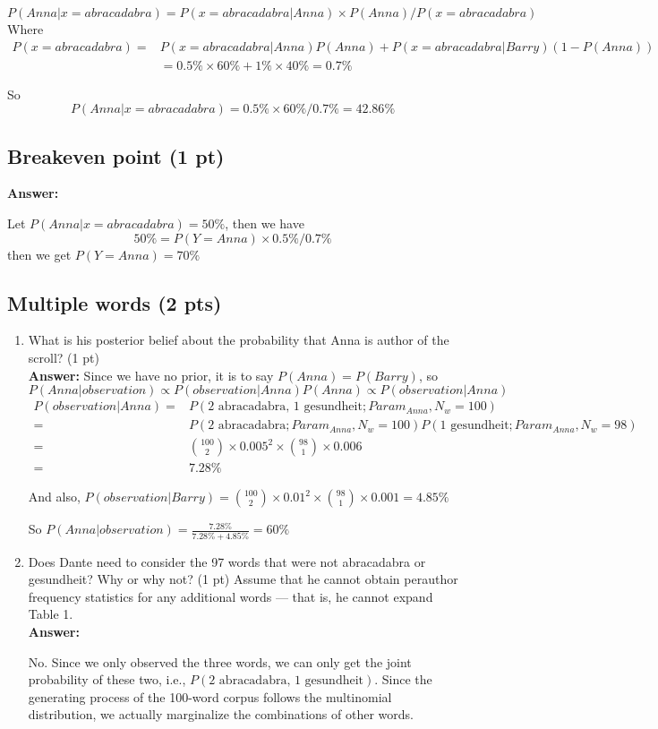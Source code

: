 \documentclass[twoside,11pt]{article}\usepackage{amsmath,amsfonts,amsthm,fullpage}
\begin{document}
\[
	P(Anna | x = abracadabra) = P(x = abracadabra | Anna) \times P(Anna) / P(x = abracadabra)
\]
Where 
\begin{align*}
		P(x = abracadabra) =&  
			 P(x = abracadabra | Anna)P(Anna) + P(x = abracadabra | Barry)(1 - P(Anna)) \\
			 &= 
			 0.5\% \times 60\% + 1\% \times 40\% = 0.7 \%
\end{align*}

So 
\[
	P(Anna | x = abracadabra) = 0.5\% \times 60\% / 0.7\% = 42.86\%	
\]

\subsection{Breakeven point (1 pt)}

\textbf{Answer:}

	Let $P(Anna | x = abracadabra) = 50\%$, then we have
\[
	50 \% = P(Y = Anna) \times 0.5\% / 0.7\%
\]
	then we get $P(Y = Anna) = 70\%$

\subsection{Multiple words (2 pts)}

	\begin{enumerate}
		\item What is his posterior belief about the probability that Anna is author of
the scroll? (1 pt) \\
		\textbf{Answer:}
Since we have no prior, it is to say $P(Anna) = P(Barry)$, so
\[
	P(Anna | observation) \propto P(observation | Anna) P(Anna) \propto P(observation | Anna)
\]
\begin{align*}
		P(observation | Anna) =&  P(\text{2 abracadabra, 1 gesundheit}; Param_{Anna}, N_w = 100) \\
		=& P(\text{2 abracadabra}; Param_{Anna}, N_w = 100) P(\text{1 gesundheit}; Param_{Anna}, N_w = 98) \\
		=& \binom{100}{2} \times 0.005 ^ 2 \times \binom{98}{1} \times 0.006 \\
		=& 7.28\%
\end{align*}

	And also, $P(observation | Barry) = \binom{100}{2} \times 0.01 ^ 2 \times \binom{98}{1} \times 0.001 = 4.85\%$

	So $P(Anna | observation) = \frac{7.28\%}{7.28\% + 4.85\%} = 60\%$
	
		\item Does Dante need to consider the 97 words that were not abracadabra or
gesundheit? Why or why not? (1 pt) Assume that he cannot obtain perauthor
frequency statistics for any additional words — that is, he cannot
expand Table 1. \\
		\textbf{Answer:}

	No. Since we only observed the three words, we can only get the joint probability of these two, i.e., $P(\text{2 abracadabra, 1 gesundheit})$. Since the generating process of the 100-word corpus follows the multinomial distribution, we actually marginalize the combinations of other words. 
	
	\end{enumerate}
		
\end{document}
